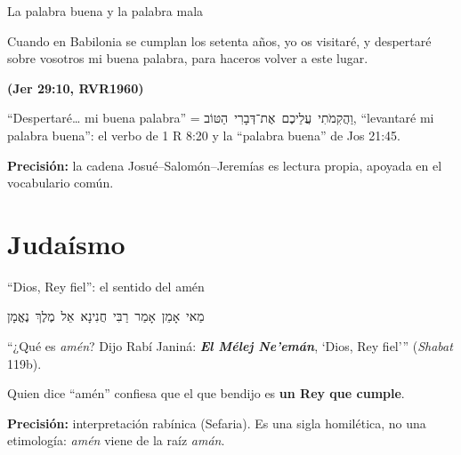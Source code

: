 \documentclass[hyperref={bookmarks=false},aspectratio=169]{beamer}
\let\raggedright\justifying
\newcommand{\heb}[1]{\mbox{\foreignlanguage{hebrew}{#1}}}
\newcommand{\fuente}[1]{\par\hfill{\upshape\bfseries\footnotesize\textcolor{azul}{#1}}}
\newcommand{\destacar}[1]{\textbf{\textcolor{azul}{#1}}}
\newcommand{\precision}[1]{{\footnotesize\color{gris}\textbf{Precisión:} #1}}
\begin{document}
\begin{frame}{La palabra buena y la palabra mala}
\centering
{}\par\medskip
\begin{cita}Cuando en Babilonia se cumplan los setenta años, yo os visitaré, y despertaré sobre vosotros mi buena palabra, para haceros volver a este lugar.\fuente{(Jer 29:10, RVR1960)}\end{cita}
\scriptsize ``Despertaré\ldots{} mi buena palabra'' = \heb{וַהֲקִמֹתִי עֲלֵיכֶם אֶת־דְּבָרִי הַטּוֹב}, ``levantaré mi palabra buena'': el verbo de 1 R 8:20 y la ``palabra buena'' de Jos 21:45.\par
\precision{la cadena Josué--Salomón--Jeremías es lectura propia, apoyada en el vocabulario común.}
\end{frame}

\section{Judaísmo}

\begin{frame}{``Dios, Rey fiel'': el sentido del amén}
\begin{center}
\Large\heb{מַאי אָמֵן אָמַר רַבִּי חֲנִינָא אֵל מֶלֶךְ נֶאֱמָן}
\end{center}
\small ``¿Qué es \emph{amén}? Dijo Rabí Janiná: \destacar{\emph{El Mélej Ne'emán}}, `Dios, Rey fiel''' (\emph{Shabat} 119b).\par\medskip
\centering
{}\par\medskip
\raggedright\small Quien dice ``amén'' confiesa que el que bendijo es \destacar{un Rey que cumple}.\par\smallskip
\precision{interpretación rabínica (Sefaria). Es una sigla homilética, no una etimología: \emph{amén} viene de la raíz \emph{amán}.}
\end{frame}
\end{document}
